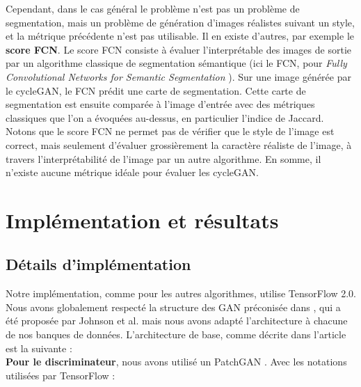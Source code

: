 Cependant, dans le cas général le problème n'est pas un problème de segmentation, mais un problème de génération d'images réalistes suivant un style, et la métrique précédente n'est pas utilisable. Il en existe d'autres, par exemple le \textbf{score FCN}. Le score FCN consiste à évaluer l'interprétable des images de sortie par un algorithme classique de segmentation sémantique (ici le FCN, pour \textit{Fully Convolutional Networks for Semantic Segmentation} \cite{long_fully_2014}). Sur une image générée par le cycleGAN, le FCN prédit une carte de segmentation. Cette carte de segmentation est ensuite comparée à l’image d’entrée avec des métriques classiques que l'on a évoquées au-dessus, en particulier l'indice de Jaccard. Notons que le score FCN ne permet pas de vérifier que le style de l'image est correct, mais seulement d'évaluer grossièrement la caractère réaliste de l'image, à travers l'interprétabilité de l'image par un autre algorithme. En somme, il n'existe aucune métrique idéale pour évaluer les cycleGAN.


\section{Implémentation et résultats}

\subsection{Détails d'implémentation}

Notre implémentation, comme pour les autres algorithmes, utilise TensorFlow 2.0. Nous avons globalement respecté la structure des GAN préconisée dans \cite{zhu_unpaired_2018}, qui a été proposée par Johnson  et  al. \cite{johnson_perceptual_2016} mais nous avons adapté l'architecture à chacune de nos banques de données. L'architecture de base, comme décrite dans l'article est la suivante : \\

\textbf{Pour le discriminateur}, nous avons utilisé un PatchGAN \cite{isola_image--image_2018-3}. Avec les notations utilisées par TensorFlow :


